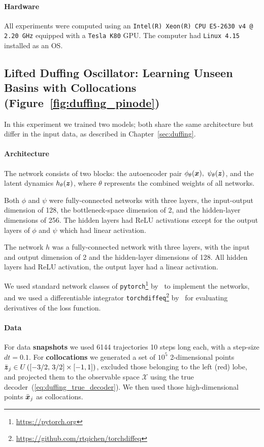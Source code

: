\paragraph{Hardware} All experiments were computed using an \texttt{Intel(R) Xeon(R) CPU E5-2630 v4 @ 2.20 GHz} equipped with a \texttt{Tesla K80} GPU. The computer had \texttt{Linux 4.15} installed as an OS.

\subsection{Lifted Duffing Oscillator: Learning Unseen Basins with Collocations (Figure~\ref{fig:duffing_pinode})}
\label{appendix:duffing_pinode}
In this experiment we trained two models; both share the same architecture but differ in the input data, as described in Chapter~\ref{sec:duffing}.

\paragraph{Architecture}
The network consists of two blocks: the autoencoder pair $\phi_\theta(\boldsymbol{x}),\ \psi_\theta(\boldsymbol{z})$, and the latent dynamics $h_\theta(\boldsymbol{z})$, where $\theta$ represents the combined weights of all networks.

Both $\phi$ and $\psi$ were fully-connected networks with three layers, the input-output dimension of 128, the bottleneck-space dimension of 2, and the hidden-layer dimensions of 256. The hidden layers had ReLU activations except for the output layers of $\phi$ and $\psi$ which had linear activation. 

The network $h$ was a fully-connected network with three layers, with the input and output dimension of 2 and the hidden-layer dimensions of 128. All hidden layers had ReLU activation, the output layer had a linear activation.

We used standard network classes of \texttt{pytorch}\footnote{\href{https://pytorch.org}{https://pytorch.org}} by~\cite{pytorch} to implement the networks, and we used a differentiable integrator \texttt{torchdiffeq}\footnote{\href{https://github.com/rtqichen/torchdiffeq}{https://github.com/rtqichen/torchdiffeq}} by~\cite{chen2018neuralode} for evaluating derivatives of the loss function. 

\paragraph{Data} For data \textbf{snapshots} we used 6144 trajectories 10 steps long each, with a step-size $dt = 0.1$. For \textbf{collocations} we generated a set of $10^5$ 2-dimensional points $\bar{\boldsymbol{z}}_j \in U\left([-3/2,\, 3/2] \times [-1, 1]\right)$, excluded those belonging to the left (red) lobe, and projected them to the observable space $\mathcal{X}$ using the true decoder~(\ref{eq:duffing_true_decoder}). We then used those high-dimensional points $\bar{\boldsymbol{x}}_j$ as collocations. 

